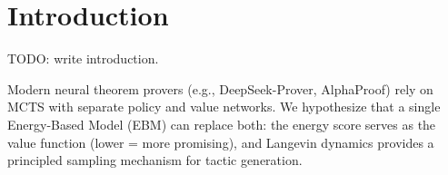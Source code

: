 
\section{Introduction}
\label{sec:introduction}

TODO: write introduction.

Modern neural theorem provers (e.g., DeepSeek-Prover, AlphaProof) rely on MCTS with
separate policy and value networks.
We hypothesize that a single Energy-Based Model (EBM) can replace both:
the energy score serves as the value function (lower = more promising),
and Langevin dynamics provides a principled sampling mechanism for tactic generation.

